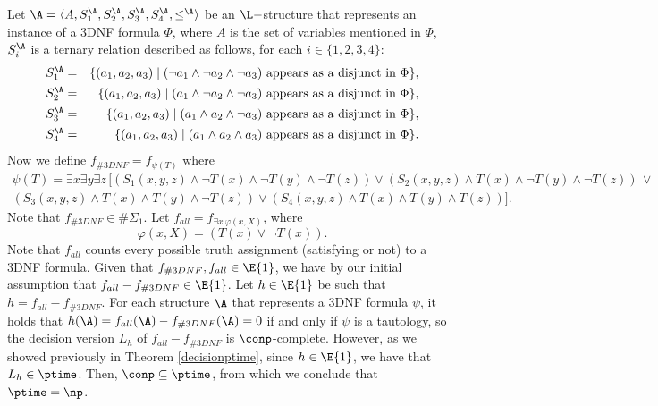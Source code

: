 Let $\A = \langle A, S_1^\A, S_2^\A, S_3^\A, S_4^\A, \leq^\A \rangle$ be an $\L-$structure that represents an instance of a 3DNF formula $\Phi$, where $A$ is the set of variables mentioned in $\Phi$, $S_i^\A$ is a ternary relation described as follows, for each $i\in\{1,2,3,4\}$:
\begin{eqnarray*}
	S_1^\A &=& \{(a_1,a_2,a_3)\mid (\neg a_1 \wedge \neg a_2 \wedge \neg a_3) \mbox{ appears as a disjunct in }\Phi\},\\
	S_2^\A &=& \{(a_1,a_2,a_3)\mid ( a_1 \wedge \neg a_2 \wedge \neg a_3) \mbox{ appears as a disjunct in }\Phi\},\\
	S_3^\A &=& \{(a_1,a_2,a_3)\mid ( a_1 \wedge  a_2 \wedge \neg a_3) \mbox{ appears as a disjunct in }\Phi\},\\
	S_4^\A &=& \{(a_1,a_2,a_3)\mid ( a_1 \wedge  a_2 \wedge  a_3) \mbox{ appears as a disjunct in }\Phi\}.
\end{eqnarray*}
Now we define $f_{\#3DNF} = f_{\psi(T)}$ where
\begin{multline*}
\psi(T) = \exists x \exists y \exists z\, [(S_1(x,y,z) \wedge \neg T(x) \wedge \neg T(y) \wedge \neg T(z)) \vee (S_2(x,y,z) \wedge T(x) \wedge \neg T(y) \wedge \neg T(z)) \, \vee \\ (S_3(x,y,z) \wedge T(x) \wedge T(y) \wedge \neg T(z)) \vee (S_4(x,y,z) \wedge T(x) \wedge T(y) \wedge T(z))].
\end{multline*}
Note that $f_{\#3DNF} \in \#\Sigma_1$. Let $f_{all} = f_{\exists x\:\varphi(x,X)}$, where
$$
\varphi(x,X) = (T(x) \vee \neg T(x)).
$$
Note that $f_{all}$ counts every possible truth assignment (satisfying or not) to a 3DNF formula. Given that $f_{\#3DNF}, f_{all} \in \E{1}$, we have by our initial assumption that $f_{all}-f_{\#3DNF} \in \E{1}$. Let $h\in\E{1}$ be such that $h = f_{all}-f_{\#3DNF}$. For each structure $\A$ that represents a 3DNF formula $\psi$, it holds that $h(\A) = f_{all}(\A)-f_{\#3DNF}(\A) = 0$ if and only if $\psi$ is a tautology, so the decision version $L_h$ of $f_{all}-f_{\#3DNF}$ is $\conp$-complete. However, as we showed previously in Theorem \ref{decisionptime}, since $h\in\E{1}$, we have that $L_h \in \ptime$. Then, $\conp \subseteq \ptime$, from which we conclude that $\ptime = \np$.
	
%
%
	
